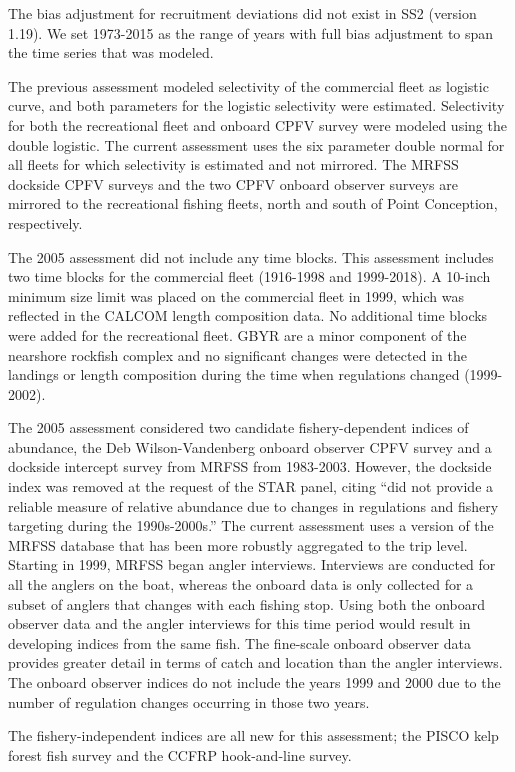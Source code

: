 \documentclass[12pt,]{article}
\begin{document}
The bias adjustment for recruitment deviations did not exist in SS2
(version 1.19). We set 1973-2015 as the range of years with full bias
adjustment to span the time series that was modeled.

The previous assessment modeled selectivity of the commercial fleet as
logistic curve, and both parameters for the logistic selectivity were
estimated. Selectivity for both the recreational fleet and onboard CPFV
survey were modeled using the double logistic. The current assessment
uses the six parameter double normal for all fleets for which
selectivity is estimated and not mirrored. The MRFSS dockside CPFV
surveys and the two CPFV onboard observer surveys are mirrored to the
recreational fishing fleets, north and south of Point Conception,
respectively.

The 2005 assessment did not include any time blocks. This assessment
includes two time blocks for the commercial fleet (1916-1998 and
1999-2018). A 10-inch minimum size limit was placed on the commercial
fleet in 1999, which was reflected in the CALCOM length composition
data. No additional time blocks were added for the recreational fleet.
GBYR are a minor component of the nearshore rockfish complex and no
significant changes were detected in the landings or length composition
during the time when regulations changed (1999-2002).

The 2005 assessment considered two candidate fishery-dependent indices
of abundance, the Deb Wilson-Vandenberg onboard observer CPFV survey and
a dockside intercept survey from MRFSS from 1983-2003. However, the
dockside index was removed at the request of the STAR panel, citing
``did not provide a reliable measure of relative abundance due to
changes in regulations and fishery targeting during the 1990s-2000s.''
The current assessment uses a version of the MRFSS database that has
been more robustly aggregated to the trip level. Starting in 1999, MRFSS
began angler interviews. Interviews are conducted for all the anglers on
the boat, whereas the onboard data is only collected for a subset of
anglers that changes with each fishing stop. Using both the onboard
observer data and the angler interviews for this time period would
result in developing indices from the same fish. The fine-scale onboard
observer data provides greater detail in terms of catch and location
than the angler interviews. The onboard observer indices do not include
the years 1999 and 2000 due to the number of regulation changes
occurring in those two years.

The fishery-independent indices are all new for this assessment; the
PISCO kelp forest fish survey and the CCFRP hook-and-line survey.
\end{document}
